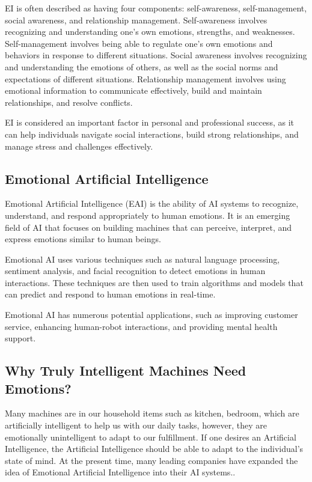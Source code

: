 EI is often described as having four components: self-awareness, self-management, social awareness, and relationship management. Self-awareness involves recognizing and understanding one's own emotions, strengths, and weaknesses. Self-management involves being able to regulate one's own emotions and behaviors in response to different situations. Social awareness involves recognizing and understanding the emotions of others, as well as the social norms and expectations of different situations. Relationship management involves using emotional information to communicate effectively, build and maintain relationships, and resolve conflicts.

EI is considered an important factor in personal and professional success, as it can help individuals navigate social interactions, build strong relationships, and manage stress and challenges effectively.

\subsection{Emotional Artificial Intelligence}
Emotional Artificial Intelligence (EAI) is the ability of AI systems to recognize, understand, and respond appropriately to human emotions. It is an emerging field of AI that focuses on building machines that can perceive, interpret, and express emotions similar to human beings. 

Emotional AI uses various techniques such as natural language processing, sentiment analysis, and facial recognition to detect emotions in human interactions. These techniques are then used to train algorithms and models that can predict and respond to human emotions in real-time.

Emotional AI has numerous potential applications, such as improving customer service, enhancing human-robot interactions, and providing mental health support.

\subsection{Why Truly Intelligent Machines Need Emotions?}
Many machines are in our household items such as kitchen, bedroom, which are artificially intelligent to help us with our daily tasks, however, they are emotionally unintelligent to adapt to our fulfillment. If one desires an Artificial Intelligence, the Artificial Intelligence should be able to adapt to the individual's state of mind. At the present time, many leading companies have expanded the idea of Emotional Artificial Intelligence into their AI systems.\cite{ISSN-2456-2165}.

